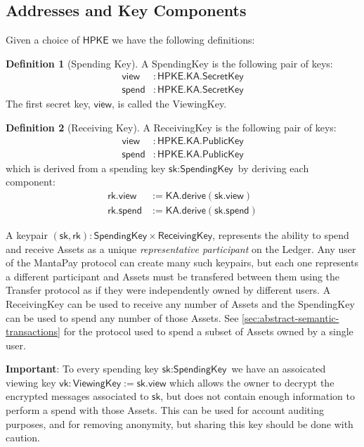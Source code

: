 \documentclass[a4paper]{article}
\newcommand{\lsubsection}[2]{\def\sectionlabel{#2} \subsection{#1}\label{sec:#2}}
\theoremstyle{definition}
\newtheorem{definition}{Definition}[subsection]
\newcommand{\Asset}{{\textsf{Asset}}}
\newcommand{\HPKE}{{\textsf{HPKE}}}
\newcommand{\KA}{{\textsf{KA}}}
\newcommand{\Ledger}{{\textsf{Ledger}}}
\newcommand{\MantaPay}{{\textsf{MantaPay}}}
\newcommand{\PublicKey}{{\textsf{PublicKey}}}
\newcommand{\ReceivingKey}{{\textsf{ReceivingKey}}}
\newcommand{\SecretKey}{{\textsf{SecretKey}}}
\newcommand{\SpendingKey}{{\textsf{SpendingKey}}}
\newcommand{\Transfer}{{\textsf{Transfer}}}
\newcommand{\ViewingKey}{{\textsf{ViewingKey}}}
\newcommand{\derive}{{\textsf{derive}}}
\newcommand{\rk}{{\textsf{rk}}}
\newcommand{\sk}{{\textsf{sk}}}
\newcommand{\spend}{{\textsf{spend}}}
\newcommand{\view}{{\textsf{view}}}
\newcommand{\vk}{{\textsf{vk}}}
\begin{document}
\lsubsection{Addresses and Key Components}{addresses-and-key-components}

Given a choice of $\HPKE$ we have the following definitions:

\begin{definition}[Spending Key]
    A \SpendingKey{} is the following pair of keys:
    \begin{align*}
        \view  &: \HPKE.\KA.\SecretKey \\
        \spend &: \HPKE.\KA.\SecretKey
    \end{align*}
    The first secret key, $\view$, is called the \ViewingKey{}.
\end{definition}

\begin{definition}[Receiving Key]
    A \ReceivingKey{} is the following pair of keys:
    \begin{align*}
        \view  &: \HPKE.\KA.\PublicKey \\
        \spend &: \HPKE.\KA.\PublicKey
    \end{align*}
    which is derived from a spending key $\sk : \SpendingKey$ by deriving each component:
    \begin{align*}
        \rk.\view  &:= \KA.\derive(\sk.\view) \\
        \rk.\spend &:= \KA.\derive(\sk.\spend)
    \end{align*}
\end{definition}

A keypair $(\sk, \rk) : \SpendingKey \times \ReceivingKey$, represents the ability to spend and receive \Asset{s} as a unique \emph{representative participant} on the \Ledger. Any user of the \MantaPay{} protocol can create many such keypairs, but each one represents a different participant and \Asset{s} must be transfered between them using the \Transfer{} protocol as if they were independently owned by different users. A \ReceivingKey{} can be used to receive any number of \Asset{s} and the \SpendingKey{} can be used to spend any number of those \Asset{s}. See \autoref{sec:abstract-semantic-transactions} for the protocol used to spend a subset of \Asset{s} owned by a single user.

\textbf{Important}: To every spending key $\sk : \SpendingKey$ we have an assoicated viewing key $\vk : \ViewingKey := \sk.\view$ which allows the owner to decrypt the encrypted messages associated to $\sk$, but does not contain enough information to perform a spend with those \Asset{s}. This can be used for account auditing purposes, and for removing anonymity, but sharing this key should be done with caution.
\end{document}
